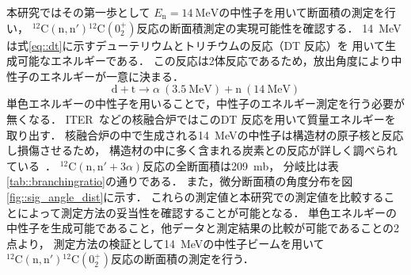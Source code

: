 \documentclass[../master]{subfiles}
\begin{document}
本研究ではその第一歩として
$E_{\text{n}} = \SI{14}{\mega\electronvolt}$の中性子を用いて断面積の測定を行い，
${}^{12}\mathrm{C}(\mathrm{n},\mathrm{n}'){}^{12}\mathrm{C} (0_2^+)$反応の断面積測定の実現可能性を確認する．
\SI{14}{\mega\electronvolt}は式\eqref{eq::dt}に示すデューテリウムとトリチウムの反応（DT 反応）を
用いて生成可能なエネルギーである．
この反応は2体反応であるため，放出角度により中性子のエネルギーが一意に決まる．%
\begin{equation}
  \mathrm{d} + \mathrm{t} \rightarrow \alpha\ (\SI{3.5}{\mega\electronvolt}) + \mathrm{n}\ (\SI{14}{\mega\electronvolt})
  \label{eq::dt}
\end{equation}
単色エネルギーの中性子を用いることで，中性子のエネルギー測定を行う必要が無くなる．
ITER~\cite{iter}などの核融合炉ではこのDT 反応を用いて質量エネルギーを取り出す．
核融合炉の中で生成される\SI{14}{\mega\electronvolt}の中性子は構造材の原子核と反応し損傷させるため，
構造材の中に多く含まれる炭素との反応が詳しく調べられている~\cite{takahashietal,kondoetal}．
${}^{12}\mathrm{C}(\mathrm{n},\mathrm{n}'+3\alpha)$反応の全断面積は\SI{209}{\milli\barn}，
分岐比は表\ref{tab::branchingratio}の通りである．
また，微分断面積の角度分布を図\ref{fig::sig_angle_dist}に示す．
これらの測定値と本研究での測定値を比較することによって測定方法の妥当性を確認することが可能となる．
単色エネルギーの中性子を生成可能であること，他データと測定結果の比較が可能であることの2点より，
測定方法の検証として\SI{14}{\mega\electronvolt}の中性子ビームを用いて
${}^{12}\mathrm{C}(\mathrm{n},\mathrm{n}'){}^{12}\mathrm{C}(0_2^+)$反応の断面積の測定を行う．
\end{document}
